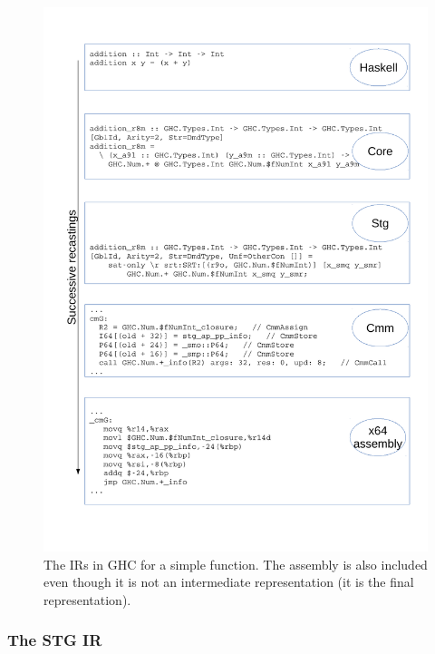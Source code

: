 \begin{figure}
\begin{mdframed}
  \centering
  \includegraphics[width=5.5in]{fig/recastings}
  \caption{The IRs in GHC for a simple function. The assembly is also
  included even though it is not an intermediate representation (it is
  the final representation).}\label{fig:recastings}
\end{mdframed}
\end{figure}

\subsubsection{The STG IR}

